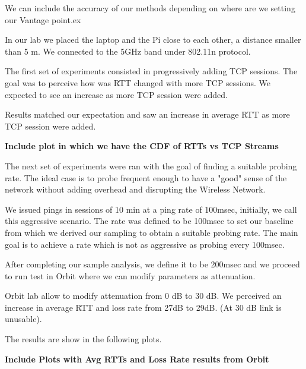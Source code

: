 We can include the accuracy of our methods depending on where are we setting our Vantage point.ex

In our lab we placed the laptop and the Pi close to each other, a distance smaller than 5 m. We connected to the 5GHz band under 802.11n protocol.

The first set of experiments consisted in progressively adding TCP sessions. The goal was to perceive how was RTT changed with more TCP sessions. We expected to see an increase as more TCP session were added.

Results matched our expectation and saw an increase in average RTT as more TCP session were added.

\textbf{Include plot in which we have the CDF of RTTs vs TCP Streams}

The next set of experiments were ran with the goal of finding a suitable probing rate. The ideal case is to probe frequent enough to have a "good" sense of the network without adding overhead and disrupting the Wireless Network.

We issued pings in sessions of 10 min at a ping rate of 100msec, initially, we call this aggressive scenario. The rate was defined to be 100msec to set our baseline from which we derived our sampling to obtain a suitable probing rate. The main goal is to achieve a rate which is not as aggressive as probing every 100msec.

After completing our sample analysis, we define it to be 200msec and we proceed to run test in Orbit where we can modify parameters as attenuation.

Orbit lab allow to modify attenuation from 0 dB to 30 dB. We perceived an increase in average RTT and loss rate from 27dB to 29dB. (At 30 dB link is unusable).

The results are show in the following plots.

\textbf{Include Plots with Avg RTTs and Loss Rate results from Orbit}




